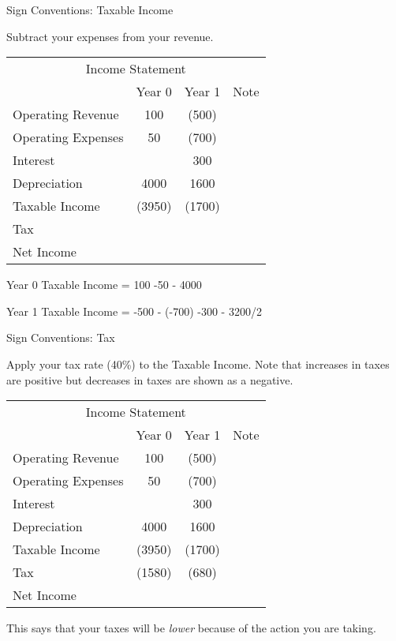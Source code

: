 \documentclass[ignorenonframetext,]{beamer}
\begin{document}
\begin{frame}{Sign Conventions: Taxable Income}

Subtract your expenses from your revenue.

\begin{table}[h]
\begin{tabular}{l||c|c||p{3cm}}
\multicolumn{4}{c}{Income Statement}\\
  &Year 0  &Year 1  &Note\\
\hline
        Operating Revenue   &   100 & (500) &\\
        Operating Expenses  &   50& (700)   &\\
        Interest    &   &   300&\\
        Depreciation    &   4000&   1600&\\
        \hline
        Taxable Income  &   (3950)& (1700)  &\\
        Tax &   &   &\\
        \hline
        Net Income  &   &   &\\
\end{tabular}
\end{table}

Year 0 Taxable Income = 100 -50 - 4000

Year 1 Taxable Income = -500 - (-700) -300 - 3200/2

\end{frame}

\begin{frame}{Sign Conventions: Tax}

Apply your tax rate (40\%) to the Taxable Income. Note that increases in
taxes are positive but decreases in taxes are shown as a negative.

\begin{table}[h]
\begin{tabular}{l||c|c||p{3cm}}
\multicolumn{4}{c}{Income Statement}\\
  &Year 0  &Year 1  &Note\\
\hline
        Operating Revenue   &   100 & (500) &\\
        Operating Expenses  &   50& (700)   &\\
        Interest    &   &   300&\\
        Depreciation    &   4000&   1600&\\
        \hline
        Taxable Income  &   (3950)& (1700)  &\\
                Tax &   (1580)& (680)&\\
        \hline
        Net Income  &   &   &\\
\end{tabular}
\end{table}

This says that your taxes will be \emph{lower} because of the action you
are taking.

\end{frame}
\end{document}
